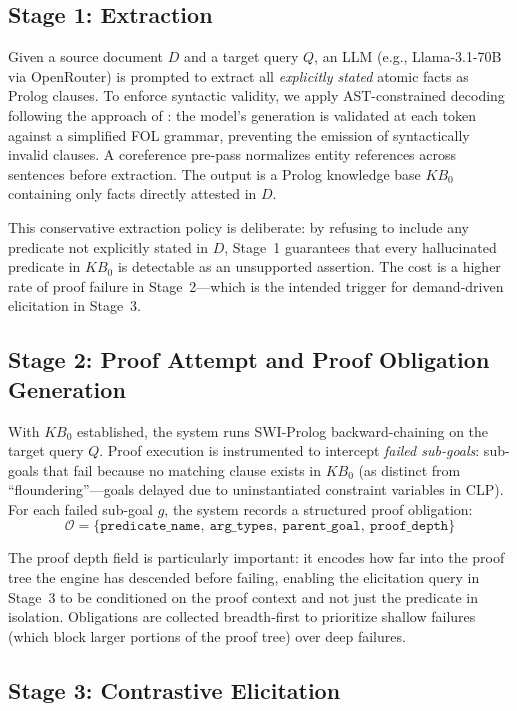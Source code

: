 \documentclass[11pt,letterpaper]{article}
\begin{document}
\subsection{Stage 1: Extraction}

Given a source document $D$ and a target query $Q$, an LLM (e.g., Llama-3.1-70B via OpenRouter) is prompted to extract all \emph{explicitly stated} atomic facts as Prolog clauses. To enforce
syntactic validity, we apply AST-constrained decoding following the approach of \citet{Putra2026}: the model's generation is
validated at each token against a simplified FOL grammar, preventing the emission of syntactically invalid clauses. A
coreference pre-pass normalizes entity references across sentences before extraction. The output is a Prolog knowledge
base $KB_0$ containing only facts directly attested in $D$.

This conservative extraction policy is deliberate: by refusing
to include any predicate not explicitly stated in $D$, Stage~1 guarantees that every hallucinated predicate in $KB_0$
is detectable as an unsupported assertion. The cost is a higher rate of proof failure in Stage~2---which is the intended
trigger for demand-driven elicitation in Stage~3.

\subsection{Stage 2: Proof Attempt and Proof Obligation Generation}

With $KB_0$ established, the system runs SWI-Prolog backward-chaining on the target query $Q$. Proof execution is instrumented
to intercept \emph{failed sub-goals}: sub-goals that fail because no matching clause exists in $KB_0$ (as distinct from ``floundering''---goals
delayed due to uninstantiated constraint variables in CLP). For each failed sub-goal $g$, the system records a structured
proof obligation:
\[
\mathcal{O} = \{\texttt{predicate\_name},\ \texttt{arg\_types},\ \texttt{parent\_goal},\ \texttt{proof\_depth}\}
\]

The proof depth field is particularly important: it encodes how far into the proof tree the engine has descended before failing, enabling the elicitation query in Stage~3 to be conditioned on the proof context
and not just the predicate in isolation. Obligations are collected breadth-first to prioritize shallow failures (which
block larger portions of the proof tree) over deep failures.

\subsection{Stage 3: Contrastive Elicitation}
\end{document}
